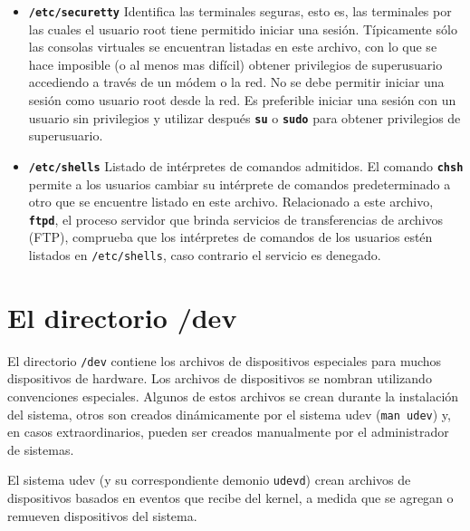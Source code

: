 \documentclass[12pt]{article}
\begin{document}
\begin{itemize}
\item \textbf{\texttt{/etc/securetty}}
 Identifica las terminales seguras, esto es, las
terminales por las cuales el usuario root tiene permitido iniciar una
sesión. Típicamente sólo las consolas virtuales se encuentran listadas
en este archivo, con lo que se hace imposible (o al menos mas difícil)
obtener privilegios de superusuario accediendo a través de un módem o la
red. No se debe permitir iniciar una sesión como usuario root desde la
red. Es preferible iniciar una sesión con un usuario sin privilegios y
utilizar después \texttt{\textbf{su}} o \texttt{\textbf{sudo}} para
obtener privilegios de superusuario.  

\item \textbf{\texttt{/etc/shells}}
 Listado de intérpretes de comandos admitidos.  El
comando \texttt{\textbf{chsh}} permite a los usuarios cambiar su
intérprete de comandos predeterminado a otro que se encuentre listado en
este archivo. Relacionado a este archivo, \texttt{\textbf{ftpd}}, el 
proceso servidor que brinda servicios de transferencias de archivos (FTP), 
comprueba que los intérpretes de comandos de los usuarios estén listados
en \texttt{/etc/shells}, caso contrario el servicio es denegado.  

\end{itemize} 
    


\section{ El directorio /dev}

El directorio \texttt{/dev} contiene los archivos de
dispositivos especiales para muchos dispositivos de hardware. Los archivos de
dispositivos se nombran utilizando convenciones especiales.  Algunos de estos
archivos se crean durante la instalación del sistema, otros son creados 
dinámicamente por el sistema udev (\texttt{man udev}) y, en casos extraordinarios,
pueden ser creados manualmente por el administrador de sistemas.

El sistema udev (y su correspondiente demonio \texttt{udevd}) crean archivos de
dispositivos basados en eventos que recibe del kernel, a medida que se agregan 
o remueven dispositivos del sistema. 

\end{document}
